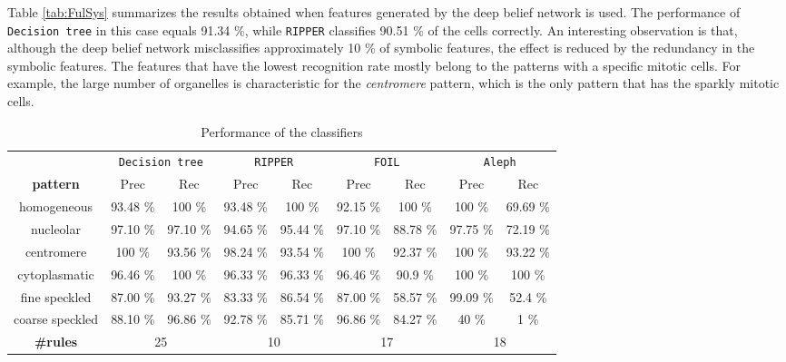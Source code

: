 Table \ref{tab:FulSys} summarizes the results obtained when features generated by the deep belief network is used. The performance of \texttt{Decision tree} in this case equals 91.34 \%, while \texttt{RIPPER} classifies 90.51 \% of the cells correctly. An interesting observation is that, although the deep belief network misclassifies approximately 10 \% of symbolic features, the effect is reduced by the redundancy in the symbolic features. The features that have the lowest recognition rate mostly belong to the patterns with a specific mitotic cells. For example, the large number of organelles is characteristic for the \textit{centromere} pattern, which is the only pattern that has the sparkly mitotic cells. 


\begin{table}
	\scriptsize
	\caption{Performance of the classifiers}
	\label{tab:Perf}
	\begin{tabular}{|c|c|c||c|c||c|c||c|c|}
		\hline
		& \multicolumn{2}{c}{\texttt{Decision tree}} & \multicolumn{2}{c}{\texttt{RIPPER}} & \multicolumn{2}{c}{\texttt{FOIL}} & \multicolumn{2}{c}{\texttt{Aleph}} \\
		\textbf{pattern} & Prec & Rec & Prec & Rec & Prec & Rec & Prec & Rec \\
		\hline \hline
		homogeneous & 93.48 \% & 100 \% & 93.48 \% & 100 \% & 92.15 \% & 100 \% & 100 \% & 69.69 \% \\
		nucleolar & 97.10 \% & 97.10 \% & 94.65 \% & 95.44 \% & 97.10 \% & 88.78 \% & 97.75 \% & 72.19 \%\\
		centromere & 100 \% & 93.56 \% & 98.24 \% & 93.54 \% & 100 \% & 92.37 \% & 100 \% & 93.22 \%\\
		cytoplasmatic & 96.46 \% & 100 \% & 96.33 \% & 96.33 \% & 96.46 \% & 90.9 \% & 100 \% & 100 \% \\
		fine speckled & 87.00 \% & 93.27 \% & 83.33 \% & 86.54 \% & 87.00 \% & 58.57 \% & 99.09 \% & 52.4 \%\\
		coarse speckled & 88.10 \% & 96.86 \% & 92.78 \% & 85.71 \% & 96.86 \% & 84.27 \% & 40 \% & 1 \%\\
		\hline \hline
		\textbf{\#rules} & \multicolumn{2}{c}{25} & \multicolumn{2}{c}{10} & \multicolumn{2}{c}{17} & \multicolumn{2}{c}{18} \\
		\hline
	\end{tabular}
\end{table}

